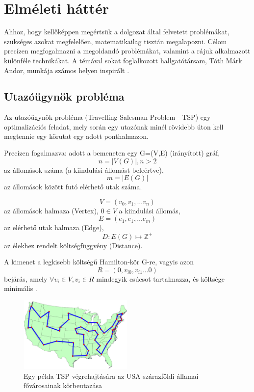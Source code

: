 \chapter{Elméleti háttér} \label{theoryChapter}

Ahhoz, hogy kellőképpen megértsük a dolgozat által felvetett problémákat, szükséges azokat megfelelően, matematikailag tisztán megalapozni. Célom precízen megfogalmazni a megoldandó problémákat, valamint a rájuk alkalmazott különféle technikákat. A témával sokat foglalkozott hallgatótársam, Tóth Márk Andor, munkája számos helyen inspirált \cite{alg_optim}.

\section{Utazóügynök probléma } \label{TSPsection}

Az utazóügynök probléma (Travelling Salesman Problem - TSP)  egy optimalizációs feladat, mely során egy utazónak minél rövidebb úton kell megtennie egy körutat egy adott ponthalmazon. 

Precízen fogalmazva: adott a bemeneten egy G=(V,E) (irányított) gráf, \[n = |V(G)|, n > 2 \] az állomások száma (a kiindulási állomást beleértve),  \[m = |E(G)| \] az állomások között futó elérhető utak száma.

\[ V = (v_0,v_1, \dots v_n )\] az állomások halmaza (Vertex), \(0 \in V\) a kiindulási állomás,
\[ E = (e_1,e_1, \dots e_m)\] az elérhető utak halmaza (Edge),
\[ D : E(G) \mapsto \mathbb{Z}^+\] az élekhez rendelt költségfüggvény (Distance).

A kimenet a legkisebb költségű Hamilton-kör G-re, vagyis azon 
\[ R = (0, v_{i0}, v_{i1} ... 0) \]
bejárás, amely \( \forall v_i \in V, v_i \in R \) mindegyik csúcsot tartalmazza, és költsége minimális \cite{alg_optim}.

\begin{figure}[ht!]
	\centering
	\includegraphics[width=0.5\textwidth]{figures/tsp-usacities.png}
	\caption{Egy példa TSP végrehajtására az USA szárazföldi államai fővárosainak körbeutazása \label{TSPpelda} \cite{TSPimage} }
\end{figure}

